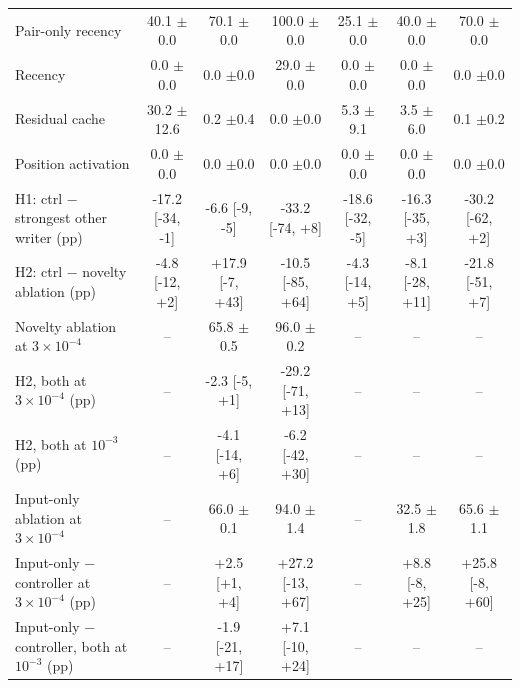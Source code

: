 \documentclass[conference]{IEEEtran}
\begin{document}
\begin{table}[t]
\begin{tabular}{@{}lcccccc@{}}
Pair-only recency & 40.1 {\scriptsize$\pm$0.0} & 70.1 {\scriptsize$\pm$0.0} & 100.0 {\scriptsize$\pm$0.0} & 25.1 {\scriptsize$\pm$0.0} & 40.0 {\scriptsize$\pm$0.0} & 70.0 {\scriptsize$\pm$0.0} \\
Recency & 0.0 {\scriptsize$\pm$0.0} & 0.0 {\scriptsize$\pm$0.0} & 29.0 {\scriptsize$\pm$0.0} & 0.0 {\scriptsize$\pm$0.0} & 0.0 {\scriptsize$\pm$0.0} & 0.0 {\scriptsize$\pm$0.0} \\
Residual cache & 30.2 {\scriptsize$\pm$12.6} & 0.2 {\scriptsize$\pm$0.4} & 0.0 {\scriptsize$\pm$0.0} & 5.3 {\scriptsize$\pm$9.1} & 3.5 {\scriptsize$\pm$6.0} & 0.1 {\scriptsize$\pm$0.2} \\
Position activation & 0.0 {\scriptsize$\pm$0.0} & 0.0 {\scriptsize$\pm$0.0} & 0.0 {\scriptsize$\pm$0.0} & 0.0 {\scriptsize$\pm$0.0} & 0.0 {\scriptsize$\pm$0.0} & 0.0 {\scriptsize$\pm$0.0} \\
\midrule
H1: ctrl $-$ strongest other writer (pp) & -17.2 {\scriptsize[-34, -1]} & -6.6 {\scriptsize[-9, -5]} & -33.2 {\scriptsize[-74, +8]} & -18.6 {\scriptsize[-32, -5]} & -16.3 {\scriptsize[-35, +3]} & -30.2 {\scriptsize[-62, +2]} \\
H2: ctrl $-$ novelty ablation (pp) & -4.8 {\scriptsize[-12, +2]} & +17.9 {\scriptsize[-7, +43]} & -10.5 {\scriptsize[-85, +64]} & -4.3 {\scriptsize[-14, +5]} & -8.1 {\scriptsize[-28, +11]} & -21.8 {\scriptsize[-51, +7]} \\
\midrule
Novelty ablation at $3\times10^{-4}$ & -- & 65.8 {\scriptsize$\pm$0.5} & 96.0 {\scriptsize$\pm$0.2} & -- & -- & -- \\
H2, both at $3\times10^{-4}$ (pp) & -- & -2.3 {\scriptsize[-5, +1]} & -29.2 {\scriptsize[-71, +13]} & -- & -- & -- \\
H2, both at $10^{-3}$ (pp) & -- & -4.1 {\scriptsize[-14, +6]} & -6.2 {\scriptsize[-42, +30]} & -- & -- & -- \\
Input-only ablation at $3\times10^{-4}$ & -- & 66.0 {\scriptsize$\pm$0.1} & 94.0 {\scriptsize$\pm$1.4} & -- & 32.5 {\scriptsize$\pm$1.8} & 65.6 {\scriptsize$\pm$1.1} \\
Input-only $-$ controller at $3\times10^{-4}$ (pp) & -- & +2.5 {\scriptsize[+1, +4]} & +27.2 {\scriptsize[-13, +67]} & -- & +8.8 {\scriptsize[-8, +25]} & +25.8 {\scriptsize[-8, +60]} \\
Input-only $-$ controller, both at $10^{-3}$ (pp) & -- & -1.9 {\scriptsize[-21, +17]} & +7.1 {\scriptsize[-10, +24]} & -- & -- & -- \\
\bottomrule
\end{tabular}
\end{table}
\end{document}
